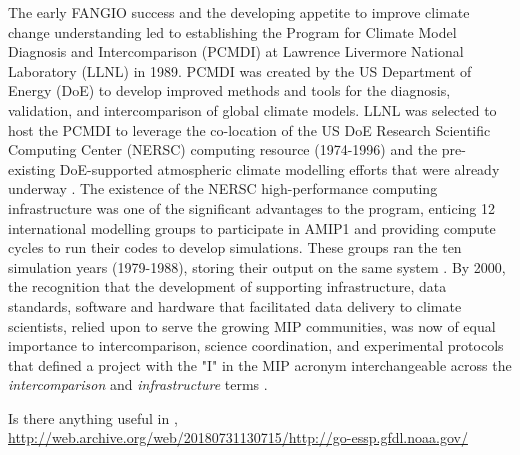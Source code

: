 \documentclass[gmd, preprint]{copernicus}
\def\cred#1{{\color{red}#1}}
\begin{document}
The early FANGIO success and the developing appetite to improve climate change understanding led to establishing the Program for Climate Model Diagnosis and Intercomparison (PCMDI) at Lawrence Livermore National Laboratory (LLNL) in 1989. PCMDI was created by the US Department of Energy (DoE) to develop improved methods and tools for the diagnosis, validation, and intercomparison of global climate models. LLNL was selected to host the PCMDI to leverage the co-location of the US DoE Research Scientific Computing Center (NERSC) computing resource (1974-1996) and the pre-existing DoE-supported atmospheric climate modelling efforts that were already underway \citep{potter_celebrating_2011}. The existence of the NERSC high-performance computing infrastructure was one of the significant advantages to the program, enticing 12 international modelling groups to participate in AMIP1 and providing compute cycles to run their codes to develop simulations. These groups ran the ten simulation years (1979-1988), storing their output on the same system \citep{gates_amip_1991, gates_amip_1992}. By 2000, the recognition that the development of supporting infrastructure, data standards, software and hardware that facilitated data delivery to climate scientists, relied upon to serve the growing MIP communities, was now of equal importance to intercomparison, science coordination, and experimental protocols that defined a project with the "I" in the MIP acronym interchangeable across the \textit{intercomparison} and \emph{infrastructure} terms \citep{gleckler_amip_2001}.

\cred{Is there anything useful in \citet{balaji_requirements_2018}, \citet{petrie_coordinating_2021} \url{http://web.archive.org/web/20180731130715/http://go-essp.gfdl.noaa.gov/}}
\end{document}
